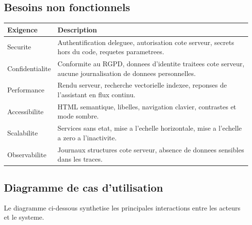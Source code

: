 \documentclass[11pt,a4paper]{article}
\begin{document}
\subsection{Besoins non fonctionnels}
\begin{tabularx}{\linewidth}{@{}lX@{}}
\toprule
\textbf{Exigence} & \textbf{Description} \\
\midrule
Securite & Authentification deleguee, autorisation cote serveur, secrets hors du code, requetes parametrees. \\
Confidentialite & Conformite au RGPD, donnees d'identite traitees cote serveur, aucune journalisation de donnees personnelles. \\
Performance & Rendu serveur, recherche vectorielle indexee, reponses de l'assistant en flux continu. \\
Accessibilite & HTML semantique, libelles, navigation clavier, contrastes et mode sombre. \\
Scalabilite & Services sans etat, mise a l'echelle horizontale, mise a l'echelle a zero a l'inactivite. \\
Observabilite & Journaux structures cote serveur, absence de donnees sensibles dans les traces. \\
\bottomrule
\end{tabularx}

\subsection{Diagramme de cas d'utilisation}
Le diagramme ci-dessous synthetise les principales interactions entre les
acteurs et le systeme.
\end{document}
